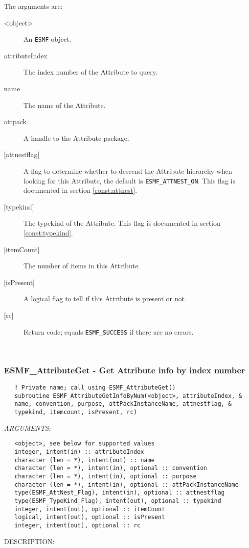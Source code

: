    The arguments are:
   \begin{description}
   \item [<object>]
   An {\tt ESMF} object.
   \item [attributeIndex]
   The index number of the Attribute to query.
   \item [name]
   The name of the Attribute.
   \item [attpack]
   A handle to the Attribute package.
   \item [{[attnestflag]}]
   A flag to determine whether to descend the
   Attribute hierarchy when looking for this Attribute, the default
   is {\tt ESMF\_ATTNEST\_ON}. This flag is documented in section
   \ref{const:attnest}.
   \item [{[typekind]}]
   The typekind of the Attribute. This flag is documented in section
   \ref{const:typekind}.
   \item [{[itemCount]}]
   The number of items in this Attribute.
   \item [{[isPresent]}]
   A logical flag to tell if this Attribute is present or not.
   \item [{[rc]}]
   Return code; equals {\tt ESMF\_SUCCESS} if there are no errors.
   \end{description}
  
   
 
\mbox{}\hrulefill\ 
 
\subsubsection [ESMF\_AttributeGet] {ESMF\_AttributeGet - Get Attribute info by index number}


  
\begin{verbatim}   ! Private name; call using ESMF_AttributeGet()
   subroutine ESMF_AttributeGetInfoByNum(<object>, attributeIndex, &
   name, convention, purpose, attPackInstanceName, attnestflag, &
   typekind, itemcount, isPresent, rc)\end{verbatim}{\em ARGUMENTS:}
\begin{verbatim}   <object>, see below for supported values
   integer, intent(in) :: attributeIndex
   character (len = *), intent(out) :: name
   character (len = *), intent(in), optional :: convention
   character (len = *), intent(in), optional :: purpose
   character (len = *), intent(in), optional :: attPackInstanceName
   type(ESMF_AttNest_Flag), intent(in), optional :: attnestflag
   type(ESMF_TypeKind_Flag), intent(out), optional :: typekind
   integer, intent(out), optional :: itemCount
   logical, intent(out), optional :: isPresent
   integer, intent(out), optional :: rc\end{verbatim}
{\sf DESCRIPTION:\\ }


